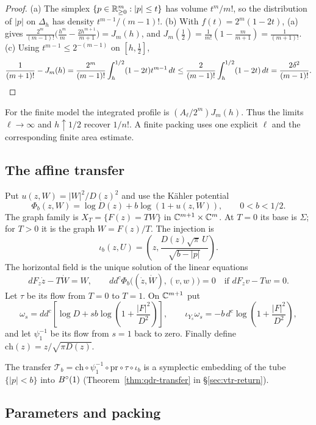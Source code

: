 \begin{proof}
(a) The simplex $\{p\in\mathbb{R}^m_{\ge0}:|p|\le t\}$ has volume $t^m/m!$, so the distribution of $|p|$ on $\Delta_h$ has density
$t^{m-1}/(m-1)!$. (b) With $f(t)=2^m(1-2t)$, (a) gives
$\frac{2^m}{(m-1)!}\bigl(\frac{h^m}m-\frac{2h^{m+1}}{m+1}\bigr)=J_m(h)$, and $J_m(\frac12)=\frac1{m!}(1-\frac m{m+1})=\frac1{(m+1)!}$.
(c) Using $t^{m-1}\le2^{-(m-1)}$ on $[h,\frac12]$,
\[
 \frac1{(m+1)!}-J_m(h)=\frac{2^m}{(m-1)!}\int_h^{1/2}(1-2t)t^{m-1}\,dt\le\frac{2}{(m-1)!}\int_h^{1/2}(1-2t)\,dt=\frac{2\delta^2}{(m-1)!}.
 \qedhere
\]
\end{proof}


For the finite model the integrated profile is $(A_\ell/2^m)J_m(h)$. Thus the limits $\ell\to\infty$ and $h\uparrow1/2$
recover $1/n!$. A finite packing uses one explicit $\ell$ and the corresponding finite area estimate.

\subsection{The affine transfer}

Put $u(z,W)=|W|^2/D(z)^2$ and use the Kähler potential
\[
 \Phi_b(z,W)=\log D(z)+b\log(1+u(z,W)),\qquad 0<b<1/2.
\]
The graph family is $X_T=\{F(z)=TW\}$ in $\mathbb{C}^{m+1}\times\mathbb{C}^m$.
At $T=0$ its base is $\Sigma$; for $T>0$ it is the graph $W=F(z)/T$.
The injection is
\[
 \iota_b(z,U)=\left(z,\frac{D(z)\sqrt\pi\,U}{\sqrt{b-|p|}}\right).
\]
The horizontal field is the unique solution of the linear equations
\[
 dF_z\dot z-T\dot W=W,\qquad
 dd^c\Phi_b\big((\dot z,\dot W),(v,w)\big)=0\quad\text{if }dF_zv-Tw=0.
\]
Let $\tau$ be its flow from $T=0$ to $T=1$. On $\mathbb{C}^{m+1}$ put
\[
 \omega_s=dd^c\!\left[\log D+sb\log\left(1+\frac{|F|^2}{D^2}\right)\right],\qquad
 \iota_{Y_s}\omega_s=-b\,d^c\log\left(1+\frac{|F|^2}{D^2}\right),
\]
and let $\psi_1^{-1}$ be its flow from $s=1$ back to zero.
Finally define $\mathrm{ch}(z)=z/\sqrt{\pi D(z)}$.

The transfer $\mathcal T_b=\mathrm{ch}\circ\psi_1^{-1}\circ\mathrm{pr}\circ\tau\circ\iota_b$ is a symplectic embedding of the tube
$\{|p|<b\}$ into $B^{\circ}(1)$ (Theorem~\ref{thm:qdr-transfer} in \S\ref{sec:vtr-return}).

\subsection{Parameters and packing}

